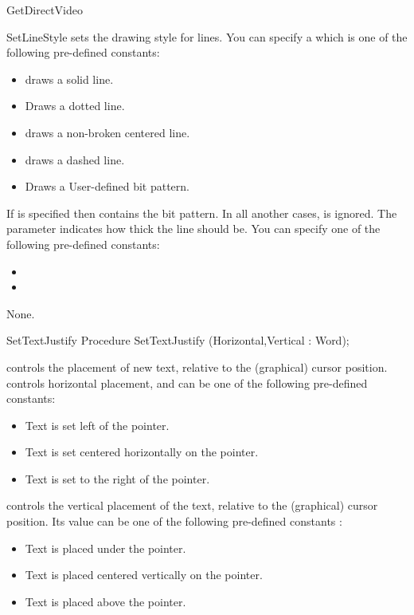 \begin{function}{GetDirectVideo}
\begin{procedure}{SetLineStyle}
\Description
{}
sets the drawing style for lines. You can specify a  which is
one of the following pre-defined constants:
\begin{itemize}
\item {} draws a solid line.
\item {} Draws a dotted line.
\item {} draws a non-broken centered line.
\item {} draws a dashed line.
\item {} Draws a User-defined bit pattern.
\end{itemize}
If  is specified then  contains the bit pattern.
In all another cases,  is ignored. The parameter 
indicates how thick the line should be. You can specify one of the following
pre-defined constants:
\begin{itemize}
\item {}
\item {}
\end{itemize}

\Errors
None.
\SeeAlso
{}
\end{procedure}
\begin{procedure}{SetTextJustify}
\Declaration
Procedure SetTextJustify (Horizontal,Vertical : Word);

\Description
{} controls the placement of new text, relative to the 
(graphical) cursor position.  controls horizontal placement, and can be
one of the following pre-defined constants:
\begin{itemize}
\item {} Text is set left of the pointer.
\item {} Text is set centered horizontally on the pointer.
\item {} Text is set to the right of the pointer.
\end{itemize}
 controls the vertical placement of the text, relative to the
(graphical) cursor position. Its value can be one of the following
pre-defined constants :
\begin{itemize}
\item {} Text is placed under the pointer.
\item {} Text is placed centered vertically on the pointer.
\item {}Text is placed above the pointer.
\end{itemize}


\end{procedure}
\end{function}
